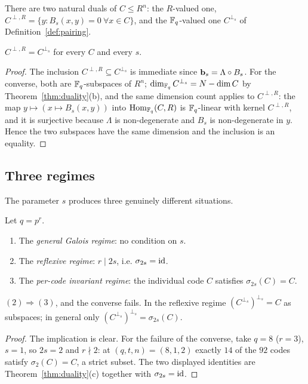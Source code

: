 There are two natural duals of $C\le R^n$: the $R$-valued one,
$C^{\perp,R}=\{y:B_s(x,y)=0\ \forall x\in C\}$, and the $\mathbb F_q$-valued one
$C^{\perp_s}$ of Definition~\ref{def:pairing}.

\begin{proposition}\label{prop:twoorth}
$C^{\perp,R}=C^{\perp_s}$ for every $C$ and every $s$.
\end{proposition}

\begin{proof}
The inclusion $C^{\perp,R}\subseteq C^{\perp_s}$ is immediate since
$\mathbf b_s=\Lambda\circ B_s$. For the converse, both are $\mathbb F_q$-subspaces of $R^n$;
$\dim_{\mathbb F_q}C^{\perp_s}=N-\dim C$ by Theorem~\ref{thm:duality}(b), and the
same dimension count applies to $C^{\perp,R}$: the map
$y\mapsto(x\mapsto B_s(x,y))$ into $\operatorname{Hom}_{\mathbb F_q}(C,R)$ is $\mathbb F_q$-linear with
kernel $C^{\perp,R}$, and it is surjective because $\Lambda$ is
non-degenerate and $B_s$ is non-degenerate in $y$. Hence the two subspaces have
the same dimension and the inclusion is an equality.
\end{proof}

\subsection{Three regimes}\label{subsec:regimes}

The parameter $s$ produces three genuinely different situations.

\begin{definition}\label{def:regimes}
Let $q=p^r$.
\begin{enumerate}[label=\textnormal{(\arabic*)},leftmargin=*]
\item The \emph{general Galois regime}: no condition on $s$.
\item The \emph{reflexive regime}: $r\mid 2s$, i.e. $\sigma_{2s}=\mathrm{id}$.
\item The \emph{per-code invariant regime}: the individual code $C$ satisfies
  $\sigma_{2s}(C)=C$.
\end{enumerate}
\end{definition}

\begin{proposition}\label{prop:regimes}
$(2)\Rightarrow(3)$, and the converse fails. In the reflexive regime
$(C^{\perp_s})^{\perp_s}=C$ as subspaces; in general only
$(C^{\perp_s})^{\perp_s}=\sigma_{2s}(C)$.
\end{proposition}

\begin{proof}
The implication is clear. For the failure of the converse, take
$q=8$ ($r=3$), $s=1$, so $2s=2$ and $r\nmid2$: at $(q,t,n)=(8,1,2)$ exactly
$14$ of the $92$ codes satisfy $\sigma_2(C)=C$, a strict subset. The two
displayed identities are Theorem~\ref{thm:duality}(c) together with
$\sigma_{2s}=\mathrm{id}$.
\end{proof}


